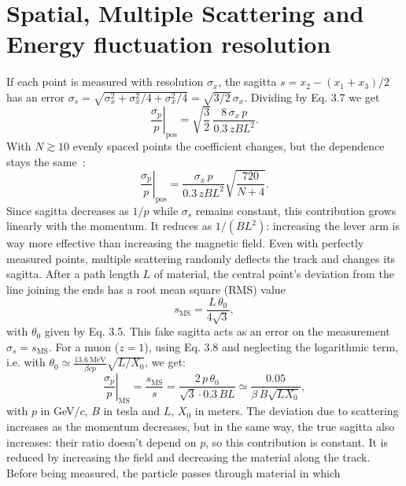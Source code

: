 \documentclass[11pt,a4paper,twoside,openright]{report}
\begin{document}
\section{Spatial, Multiple Scattering and Energy fluctuation resolution}
If each point is measured with resolution $\sigma_x$, the sagitta
$s = x_2 - (x_1 + x_3)/2$ has an error
$\sigma_s = \sqrt{\sigma_x^2 + \sigma_x^2/4 + \sigma_x^2/4}
= \sqrt{3/2}\,\sigma_x$. Dividing by Eq. 3.7 we get
\begin{equation}
  \left.\frac{\sigma_p}{p}\right|_{\mathrm{pos}}
  = \sqrt{\frac{3}{2}}\,\frac{8\,\sigma_x\, p}{0.3\, z B L^2} .
  \label{eq:res_pos3}
\end{equation}
With $N \gtrsim 10$ evenly spaced points the coefficient changes, but the dependence stays the same~\cite[Sez.~35.12]{PDG2026}:
\begin{equation}
  \left.\frac{\sigma_p}{p}\right|_{\mathrm{pos}}
  = \frac{\sigma_x\, p}{0.3\, z B L^2}\sqrt{\frac{720}{N+4}} .
  \label{eq:res_pos}
\end{equation}
Since sagitta decreases as $1/p$ while $\sigma_s$ remains
constant, this contribution grows linearly with the momentum. It reduces as $1/(BL^2)$: increasing the lever arm is way more effective than increasing the magnetic field. Even with perfectly measured points, multiple scattering randomly deflects the track and changes its sagitta. After a path length $L$ of material, the central point's deviation from the line joining the ends has a root mean square (RMS) value~\cite[Sez.~34.3]{PDG2026}
\begin{equation}
  s_{\mathrm{MS}} = \frac{L\,\theta_0}{4\sqrt{3}} ,
  \label{eq:s_ms}
\end{equation}
with $\theta_0$ given by Eq. 3.5. This fake sagitta acts as an error on the measurement $\sigma_s = s_{\mathrm{MS}}$. For a muon
($z = 1$), using Eq. 3.8 and neglecting the logarithmic term, i.e. with
$\theta_0 \simeq \frac{13.6~\mathrm{MeV}}{\beta c p}\sqrt{L/X_0}$,
we get:
\begin{equation}
  \left.\frac{\sigma_p}{p}\right|_{\mathrm{MS}}
  = \frac{s_{\mathrm{MS}}}{s}
  = \frac{2\,p\,\theta_0}{\sqrt{3}\cdot 0.3\, B L}
  \simeq \frac{0.05}{\beta\, B \sqrt{L X_0}} ,
  \label{eq:res_ms}
\end{equation}
with $p$ in GeV/$c$, $B$ in tesla and $L$, $X_0$ in meters. The deviation due to scattering increases as the momentum decreases, but in the same way, the true sagitta also increases: their ratio doesn't depend on $p$, so this contribution is constant. It is reduced by increasing the field and decreasing the material along the track. Before being measured, the particle passes through material in which
\end{document}
